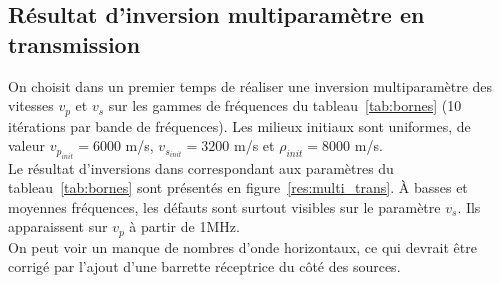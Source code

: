 \documentclass[a4paper,11pt]{report} %
\begin{document}
\subsection{Résultat d'inversion multiparamètre en transmission}

On choisit dans un premier temps de réaliser une inversion multiparamètre des vitesses $v_{p}$ et $v_{s}$ sur les gammes de fréquences du tableau~\ref{tab:bornes} (10 itérations par bande de fréquences). Les milieux initiaux sont uniformes, de valeur $v_{p_{init}}=6000$ m/s, $v_{s_{init}}=3200$ m/s et $\rho_{init} = 8000$ m/s.\\

Le résultat d'inversions dans correspondant aux paramètres du tableau~\ref{tab:bornes} sont présentés en figure~\ref{res:multi_trans}. À basses et moyennes fréquences, les défauts sont surtout visibles sur le paramètre $v_{s}$. Ils apparaissent sur $v_{p}$ à partir de 1MHz. \\

On peut voir un manque de nombres d'onde horizontaux, ce qui devrait être corrigé par l'ajout d'une barrette réceptrice du côté des sources. 
\end{document}
